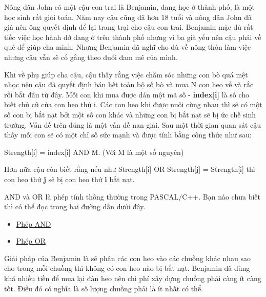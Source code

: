 Nông dân John có một cậu con trai là Benjamin, đang học ở thành phố, là một học sinh rất giỏi toán. Năm nay cậu cũng đã hơn 18 tuổi và nông dân John đã già nên ông quyết định để lại trang trại cho cậu con trai. Benjamin mặc dù rất tiếc việc học hành dở dang ở trên thành phố nhưng vì ba già yếu nên cậu phải về quê để giúp cha minh. Nhưng Benjamin đã nghĩ cho dù về nông thôn làm việc nhưng cậu vẫn sẽ cố gắng theo đuổi đam mê của mình.

Khi về phụ giúp cha cậu, cậu thấy rằng việc chăm sóc những con bò quá mệt nhọc nên cậu đã quyết định bán hết toàn bộ số bò và mua N con heo về và rắc rồi bắt đầu từ đây. Mỗi con khi mua được dán một mã số - \textbf{ index[i] } là số cho biết chủ cũ của con heo thứ i. Các con heo khi được nuôi cùng nhau thì sẽ có một số con bị bắt nạt bởi một số con khác và những con bị bắt nạt sẽ bị ức chế sinh trưởng. Vấn đề trên đúng là một vấn đề nan giải. Sau một thời gian quan sát cậu thấy mỗi con sẽ có một chỉ số sức mạnh và được tính bằng công thức như sau:

Strength[i] = index[i] AND M. (Với M là một số nguyên)

Hơn nữa cậu còn biết rằng nếu như Strength[i] OR Strength[j] = Strength[i] thì con heo thứ \textbf{ j } sẽ bị con heo thứ \textbf{ i } bắt nạt.

AND và OR là phép tính thông thường trong PASCAL/C++. Bạn nào chưa biết thì có thể đọc trong hai đường dẫn dưới đây.
\begin{itemize}
	\item \href{http://vi.wikipedia.org/wiki/Ph%C3%A9p_to%C3%A1n_thao_t%C3%A1c_bit#AND}{Phép AND }
	\item \href{http://vi.wikipedia.org/wiki/Ph%C3%A9p_to%C3%A1n_thao_t%C3%A1c_bit#OR}{Phép OR }
\end{itemize}

Giải pháp của Benjamin là sẽ phân các con heo vào các chuồng khác nhau sao cho trong mỗi chuồng thì không có con heo nào bị bắt nạt. Benjamin đã dùng khá nhiều tiền để mua lại đàn heo nên chi phí xây dựng chuồng phải càng ít càng tốt. Điều đó có nghĩa là số lượng chuồng phải là ít nhất có thể.